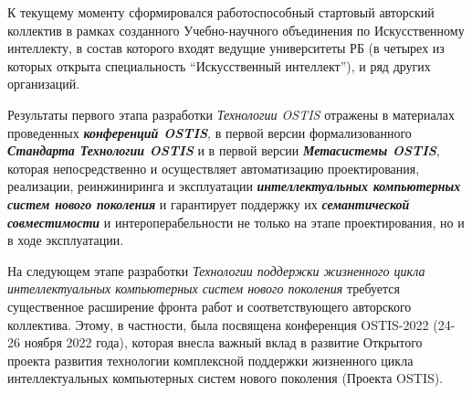 \begin{partbacktext}
К текущему моменту сформировался работоспособный стартовый авторский коллектив в рамках созданного Учебно-научного объединения по Искусственному интеллекту, в состав которого входят ведущие университеты РБ (в четырех из которых открыта специальность ``Искусственный интеллект''), и ряд других организаций.

Результаты первого этапа разработки \textit{Технологии OSTIS} отражены в материалах проведенных \textbf{\textit{конференций OSTIS}}, в первой версии формализованного \textbf{\textit{Стандарта Технологии OSTIS}} и в первой версии \textbf{\textit{Метасистемы OSTIS}}, которая непосредственно и осуществляет автоматизацию проектирования, реализации, реинжиниринга и эксплуатации \textbf{\textit{интеллектуальных компьютерных систем нового поколения}} и гарантирует поддержку их \textbf{\textit{семантической совместимости}} и интероперабельности не только на этапе проектирования, но и в ходе эксплуатации.

На следующем этапе разработки \textit{Технологии поддержки жизненного цикла интеллектуальных компьютерных систем нового поколения} требуется существенное расширение фронта работ и соответствующего авторского коллектива. Этому, в частности, была посвящена конференция OSTIS-2022 (24-26 ноября 2022 года), которая внесла важный вклад в развитие Открытого проекта развития технологии комплексной поддержки жизненного цикла интеллектуальных компьютерных систем нового поколения (Проекта OSTIS).
\end{partbacktext}